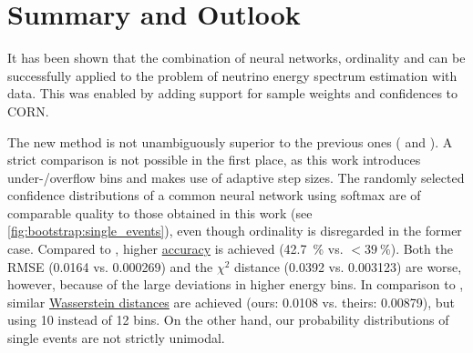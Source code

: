 \chapter{Summary and Outlook} \label{sec:summary}

It has been shown that
the combination of neural networks, ordinality and \dsea{}
  can be successfully applied to
  the problem of neutrino energy spectrum estimation
  with \icecube{} data.
This was enabled by
  adding support for
    sample weights
    and confidences
  to \ac{CORN}.

The new method is not unambiguously superior to the previous ones
  (\cite{dsea_jan} and \cite{dsea_samuel}).
A strict comparison is not possible
    in the first place,
  as this work introduces under-/overflow bins
  and makes use of adaptive step sizes.
The randomly selected confidence distributions of a common neural network using softmax \cite{dsea_samuel}
  are of comparable quality to those obtained in this work (see \autoref{fig:bootstrap:single_events}),
    even though ordinality is disregarded in the former case.
%
Compared to \cite{dsea_samuel},
  higher \hyperref[sec:unfolding:metrics:accuracy]{accuracy} is achieved
    (\SI{42.7}{\percent} vs. $< \SI{39}{\percent}$).
Both the \ac{RMSE}
  (\num{0.0164} vs. \num{0.000269})
and the $\chi^2$ distance
  (\num{0.0392} vs. \num{0.003123})
are worse,
  however,
because of the large deviations in higher energy bins.
%
In comparison to \cite{dsea_jan},
  similar \hyperref[sec:unfolding:metrics:wd]{Wasserstein distances} are achieved
    (ours: \num{0.0108} vs. theirs: \num{0.00879}),
    but using \num{10} instead of \num{12} bins.
On the other hand,
our probability distributions of single events are not strictly unimodal.


